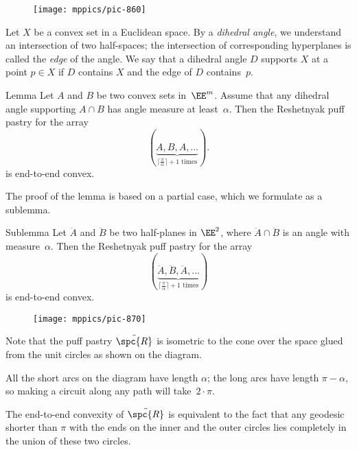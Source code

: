 {

\begin{wrapfigure}{o}{30mm}
\vskip-4mm
\centering
\texttt{[image: mppics/pic-860]}
\end{wrapfigure}

Let $X$ be a convex set in a Euclidean space.
By a \emph{dihedral angle}, we understand an intersection of two half-spaces;
the intersection of corresponding hyperplanes is called the {}\emph{edge} of the angle.
We say that a dihedral angle $D$ 
supports
 $X$ at a point $p\in X$ 
if $D$ contains $X$ and the edge of $D$ contains~$p$.

}

\begin{thm}{Lemma}\label{lem:end-to-end-convex}
Let $A$ and $B$ be two convex sets in~$\EE^m$.
Assume that any dihedral angle supporting $A\cap B$ has angle measure at least~$\alpha$.
Then the Reshetnyak puff pastry for the array
\[(\underbrace{A,B,A,\dots}_{\text{$\lceil\tfrac\pi\alpha\rceil+1$ times}}).\]
is end-to-end convex. 
\end{thm}


The proof of the lemma is based on a partial case,
which we formulate as a sublemma.

\begin{thm}{Sublemma}\label{sublem:end-to-end-convex}
Let $\ddot A$ and $\ddot B$ be two  
half-planes in $\EE^2$, where $\ddot A\cap \ddot B$ is an angle with measure~$\alpha$.
Then the Reshetnyak puff pastry for the array \[(\underbrace{\ddot A,\ddot B,\ddot A,\dots}_{\text{$\lceil\tfrac\pi\alpha\rceil+1$ times}})\]
is end-to-end convex. 
\end{thm}

\begin{wrapfigure}{r}{35mm}
\vskip0mm
\centering
\texttt{[image: mppics/pic-870]}
\end{wrapfigure}

Note that the puff pastry $\ddot{\spc{R}}$ is isometric to the cone over the space glued from the unit circles as shown on the diagram.

All the short arcs on the diagram have length $\alpha$;
the long arcs have length $\pi-\alpha$,
so making a circuit along any path will take~$2\cdot\pi$.

The end-to-end convexity of $\ddot{\spc{R}}$ is equivalent to the fact that any geodesic shorter than $\pi$ with the ends on the inner and the outer circles lies completely in the union of these two circles.

